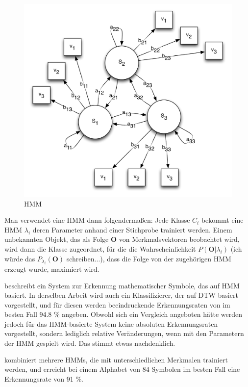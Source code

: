 \begin{figure}
  \centering \includegraphics[width=\textwidth]{figures/hmm.png}
  \caption{HMM}
  \label{fig:hmm}
\end{figure}

Man verwendet eine HMM dann folgendermaßen: Jede Klasse $C_i$ bekommt eine HMM $\lambda_i$ deren Parameter anhand einer Stichprobe trainiert werden. Einem unbekannten Objekt, das als Folge $\mathbf{O}$ von Merkmalsvektoren beobachtet wird, wird dann die Klasse zugeordnet, für die die Wahrscheinlichkeit $P(\mathbf{O}|\lambda_i)$ (\TODO ich würde das $P_{\lambda_i}(\mathbf{O})$ schreiben...), dass die Folge von der zugehörigen HMM erzeugt wurde, maximiert wird.

\citet{Xie:2007p11427} beschreibt ein System zur Erkennung mathematischer Symbole, das auf HMM basiert. In derselben Arbeit wird auch ein Klassifizierer, der auf DTW basiert vorgestellt, und für diesen werden beeindruckende Erkennungsraten von im besten Fall 94.8 \% angeben. Obwohl sich ein Vergleich angeboten hätte werden jedoch für das HMM-basierte System keine absoluten Erkennungsraten vorgestellt, sondern lediglich relative Veränderungen, wenn mit den Parametern der HMM gespielt wird. Das stimmt etwas nachdenklich.

\citet{Winkler:1996p11716} kombiniert mehrere HMMs, die mit unterschiedlichen Merkmalen trainiert werden, und erreicht bei einem Alphabet von 84 Symbolen im besten Fall eine Erkennungsrate von 91 \%.

